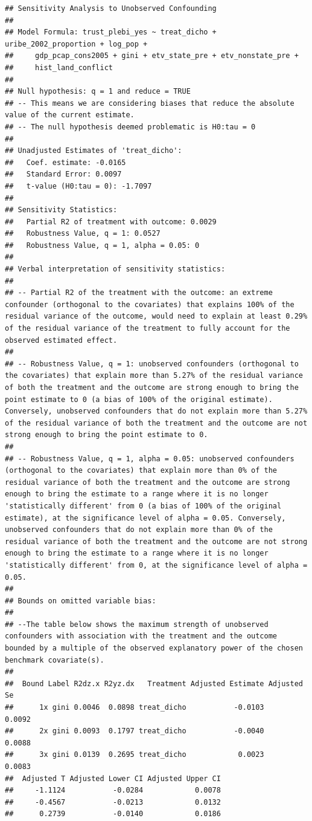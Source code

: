 \documentclass[
]{article}
\begin{document}
\begin{verbatim}
## Sensitivity Analysis to Unobserved Confounding
## 
## Model Formula: trust_plebi_yes ~ treat_dicho + uribe_2002_proportion + log_pop + 
##     gdp_pcap_cons2005 + gini + etv_state_pre + etv_nonstate_pre + 
##     hist_land_conflict
## 
## Null hypothesis: q = 1 and reduce = TRUE 
## -- This means we are considering biases that reduce the absolute value of the current estimate.
## -- The null hypothesis deemed problematic is H0:tau = 0 
## 
## Unadjusted Estimates of 'treat_dicho': 
##   Coef. estimate: -0.0165 
##   Standard Error: 0.0097 
##   t-value (H0:tau = 0): -1.7097 
## 
## Sensitivity Statistics:
##   Partial R2 of treatment with outcome: 0.0029 
##   Robustness Value, q = 1: 0.0527 
##   Robustness Value, q = 1, alpha = 0.05: 0 
## 
## Verbal interpretation of sensitivity statistics:
## 
## -- Partial R2 of the treatment with the outcome: an extreme confounder (orthogonal to the covariates) that explains 100% of the residual variance of the outcome, would need to explain at least 0.29% of the residual variance of the treatment to fully account for the observed estimated effect.
## 
## -- Robustness Value, q = 1: unobserved confounders (orthogonal to the covariates) that explain more than 5.27% of the residual variance of both the treatment and the outcome are strong enough to bring the point estimate to 0 (a bias of 100% of the original estimate). Conversely, unobserved confounders that do not explain more than 5.27% of the residual variance of both the treatment and the outcome are not strong enough to bring the point estimate to 0.
## 
## -- Robustness Value, q = 1, alpha = 0.05: unobserved confounders (orthogonal to the covariates) that explain more than 0% of the residual variance of both the treatment and the outcome are strong enough to bring the estimate to a range where it is no longer 'statistically different' from 0 (a bias of 100% of the original estimate), at the significance level of alpha = 0.05. Conversely, unobserved confounders that do not explain more than 0% of the residual variance of both the treatment and the outcome are not strong enough to bring the estimate to a range where it is no longer 'statistically different' from 0, at the significance level of alpha = 0.05.
## 
## Bounds on omitted variable bias:
## 
## --The table below shows the maximum strength of unobserved confounders with association with the treatment and the outcome bounded by a multiple of the observed explanatory power of the chosen benchmark covariate(s).
## 
##  Bound Label R2dz.x R2yz.dx   Treatment Adjusted Estimate Adjusted Se
##      1x gini 0.0046  0.0898 treat_dicho           -0.0103      0.0092
##      2x gini 0.0093  0.1797 treat_dicho           -0.0040      0.0088
##      3x gini 0.0139  0.2695 treat_dicho            0.0023      0.0083
##  Adjusted T Adjusted Lower CI Adjusted Upper CI
##     -1.1124           -0.0284            0.0078
##     -0.4567           -0.0213            0.0132
##      0.2739           -0.0140            0.0186
\end{verbatim}
\end{document}
